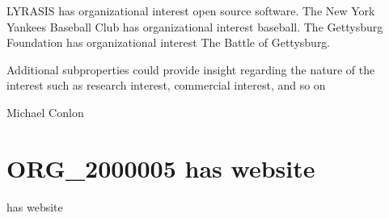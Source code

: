 \documentclass[letterpaper,10pt,english]{sphinxmanual}
\begin{document}
\begin{sphinxShadowBox}

\sphinxAtStartPar
LYRASIS has organizational interest open source software.  The New York Yankees Baseball Club has organizational interest baseball.  The Gettysburg Foundation has organizational interest The Battle of Gettysburg.
\end{sphinxShadowBox}

\begin{sphinxShadowBox}

\sphinxAtStartPar
Additional subproperties could provide insight regarding the nature of the interest such as research interest, commercial interest, and so on
\end{sphinxShadowBox}

\begin{sphinxShadowBox}

\sphinxAtStartPar
{}
\end{sphinxShadowBox}

\begin{sphinxShadowBox}

\sphinxAtStartPar
Michael Conlon 
\end{sphinxShadowBox}
\begin{quote}
\label{\detokenize{doc-ORG_2000005:org-2000005}}\label{\detokenize{doc-ORG_2000005:has-website}}\label{\detokenize{doc-ORG_2000005:org-2000005}}
\ignorespaces \end{quote}


\section{ORG\_2000005 \sphinxhyphen{} has website}
\label{\detokenize{doc-ORG_2000005:org-2000005-has-website}}\label{\detokenize{doc-ORG_2000005:index-0}}\label{\detokenize{doc-ORG_2000005::doc}}
\begin{sphinxShadowBox}

\sphinxAtStartPar
has website
\end{sphinxShadowBox}
\end{document}
